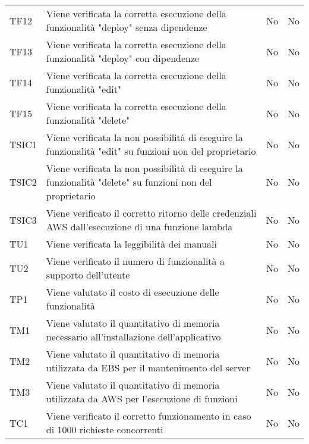 \begin{longtable}{
		>{\centering}p{}
		>{}p{}
		>{\centering}p{}
		>{\centering}p{} }
		TF12 & Viene verificata la corretta esecuzione della funzionalità "deploy" senza dipendenze &
		No &
		No \tabularnewline
		
		TF13 & Viene verificata la corretta esecuzione della funzionalità "deploy" con dipendenze &
		No &
		No \tabularnewline
		
		TF14 & Viene verificata la corretta esecuzione della funzionalità "edit" &
		No &
		No \tabularnewline
		
		TF15 & Viene verificata la corretta esecuzione della funzionalità "delete" &
		No &
		No \tabularnewline
		
		
		
		
		TSIC1 & Viene verificata la non possibilità di eseguire la funzionalità "edit" su funzioni non del proprietario &
		No &
		No \tabularnewline
		
		TSIC2 & Viene verificata la non possibilità di eseguire la funzionalità "delete" su funzioni non del proprietario &
		No &
		No \tabularnewline
		
		TSIC3 & Viene verificato il corretto ritorno delle credenziali AWS\ped{\textit{G}} dall'esecuzione di una funzione lambda\ped{\textit{G}} &
		No &
		No \tabularnewline
		
		
		
		
		TU1 & Viene verificata la leggibilità dei manuali &
		No &
		No \tabularnewline
		
		TU2 & Viene verificato il numero di funzionalità a supporto dell'utente &
		No &
		No \tabularnewline




		TP1 & Viene valutato il costo di esecuzione delle funzionalità &
		No &
		No \tabularnewline
		
		
		
		

		TM1 & Viene valutato il quantitativo di memoria necessario all'installazione dell'applicativo &
		No &
		No \tabularnewline
		
		TM2 & Viene valutato il quantitativo di memoria utilizzata da EBS per il mantenimento del server &
		No &
		No \tabularnewline
		
		TM3 & Viene valutato il quantitativo di memoria utilizzata da AWS per l'esecuzione di funzioni &
		No &
		No \tabularnewline
		




		TC1 & Viene verificato il corretto funzionamento in caso di 1000 richieste concorrenti &
		No &
		No \tabularnewline
		




\end{longtable}
